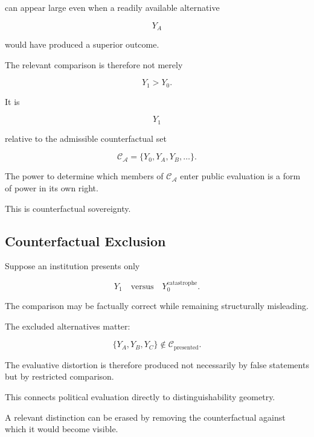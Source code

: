 \documentclass[11pt]{article}
\theoremstyle{remark}
\newcommand{\Adm}{\mathcal{A}}
\begin{document}
can appear large even when a readily available alternative

\begin{equation}
Y_A
\end{equation}

would have produced a superior outcome.

The relevant comparison is therefore not merely

\begin{equation}
Y_1>Y_0.
\end{equation}

It is

\begin{equation}
Y_1
\end{equation}

relative to the admissible counterfactual set

\begin{equation}
\mathcal{C}_{\Adm}
=
\{
Y_0,Y_A,Y_B,\ldots
\}.
\end{equation}

The power to determine which members of $\mathcal{C}_{\Adm}$ enter public evaluation is a form of power in its own right.

This is counterfactual sovereignty.

\subsection{Counterfactual Exclusion}

Suppose an institution presents only

\begin{equation}
Y_1
\quad\text{versus}\quad
Y_0^{\mathrm{catastrophe}}.
\end{equation}

The comparison may be factually correct while remaining structurally misleading.

The excluded alternatives matter:

\begin{equation}
\{
Y_A,Y_B,Y_C
\}
\notin
\mathcal{C}_{\mathrm{presented}}.
\end{equation}

The evaluative distortion is therefore produced not necessarily by false statements but by restricted comparison.

This connects political evaluation directly to distinguishability geometry.

A relevant distinction can be erased by removing the counterfactual against which it would become visible.
\end{document}
